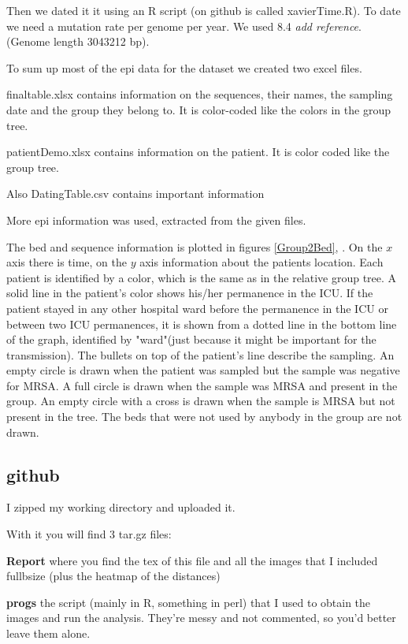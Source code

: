 \documentclass[12pt,a4paper]{article}
\begin{document}
Then we dated it it using an R script (on github is called xavierTime.R). To date we need a mutation rate per genome per year. We used 8.4 \textit{add reference}. (Genome length 3043212 bp).

To sum up most of the epi data for the dataset we created two excel files.

finaltable.xlsx contains information on the sequences, their names, the sampling date and the group they belong to. It is color-coded like the colors in the group tree.

patientDemo.xlsx contains information on the patient. It is color coded like the group tree.

Also DatingTable.csv contains important information

More epi information was used, extracted from the given files. 

The bed and sequence information is plotted in figures \ref{Group2Bed}, . On the $x$ axis there is time, on the $y $ axis information about the patients location. Each patient is identified by a color, which is the same as in the relative group tree. A solid line in the patient's color shows his/her permanence in the ICU. If the patient stayed in any other hospital ward before the permanence in the ICU or between two ICU permanences, it is shown from a dotted line in the bottom line of the graph, identified by "ward"(just because it might be important for the transmission). The bullets on top of the patient's line describe the sampling. An empty circle is drawn when the patient was sampled but the sample was negative for MRSA. A full circle is drawn when the sample was MRSA and present in the group. An empty circle with a cross is  drawn when the sample is MRSA but not present in the tree. The beds that were not used by anybody in the group are not drawn.
 

\subsection{github}

I zipped my working directory and uploaded it.

With it you will find 3 tar.gz files:

\textbf{Report} where you find the tex of this file and all the images that I included fullbsize (plus the heatmap of the distances)

\textbf{progs} the script (mainly in R, something in perl) that I used to obtain the images and run the analysis. They're messy and not commented, so you'd better leave them alone.
\end{document}
